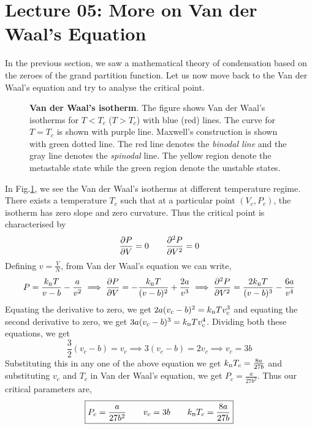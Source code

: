 \section*{Lecture 05: More on Van der Waal's Equation}
In the previous section, we saw a mathematical theory of condensation based on the zeroes of the grand partition function. Let us now move back to the Van der Waal's equation and try to analyse the critical point. 
\begin{figure}[H]\label{fig:isotherms}


    \centering


    


    \caption{\textbf{Van der Waal's isotherm}. The figure shows Van der Waal's isotherms for $T<T_c$ ($T>T_c$) with blue (red) lines. The curve for $T=T_c$ is shown with purple line. Maxwell's construction is shown with green dotted line. The red line denotes the \textit{binodal line} and the gray line denotes the \textit{spinodal} line. The yellow region denote the metastable state while the green region denote the unstable states.}


\end{figure}


\noindent
\noindent
In Fig.\ref{fig:isotherms}, we see the Van der Waal's isotherms at different temperature regime. There exists a temperature $T_c$ such that at a particular point $(V_c, P_c)$, the isotherm has zero slope and zero curvature. Thus the critical point is characterised by 
$$\pdv{P}{V}=0\qquad \pdv[2]{P}{V}=0$$
Defining $v=\frac{V}{N}$, from Van der Waal's equation we can write,
\begin{align}
    P = \frac{k_{\text{\tiny B}} T}{v-b} - \frac{a}{v^2} \implies \pdv{P}{V} = -\frac{k_{\text{\tiny B}} T}{(v-b)^2} +\frac{2a}{v^3}\implies \pdv[2]{P}{V} = \frac{2k_{\text{\tiny B}} T}{(v-b)^3}-\frac{6a}{v^4}
\end{align}
Equating the derivative to zero, we get $2a(v_c-b)^2=k_{\text{\tiny B}} T v_c^3$ and equating the second derivative to zero, we get $3a(v_c-b)^3 = k_{\text{\tiny B}} T v_c^4$. Dividing both these equations, we get 
$$\frac{3}{2}(v_c-b) =v_c \implies 3(v_c-b)=2v_c \implies {v_c=3b}$$
Substituting this in any one of the above equation we get $k_{\text{\tiny B}} T_c = \frac{8a}{27b}$ and substituting $v_c$ and $T_c$ in Van der Waal's equation, we get $P_c = \frac{a}{27b^2}$. Thus our critical parameters are,
$$\boxed{P_c = \frac{a}{27b^2}\qquad {v_c=3b}\qquad k_{\text{\tiny B}} T_c = \frac{8a}{27b}}$$
